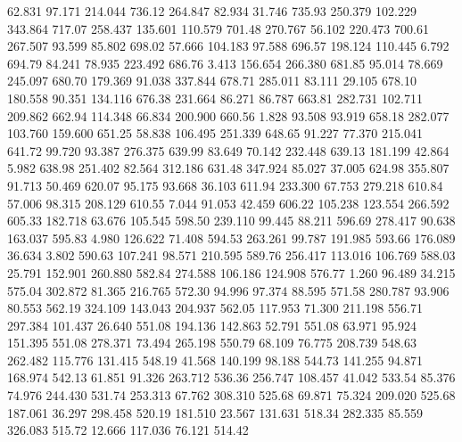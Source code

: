   62.831   97.171  214.044       736.12
 264.847   82.934   31.746       735.93
 250.379  102.229  343.864       717.07
 258.437  135.601  110.579       701.48
 270.767   56.102  220.473       700.61
 267.507   93.599   85.802       698.02
  57.666  104.183   97.588       696.57
 198.124  110.445    6.792       694.79
  84.241   78.935  223.492       686.76
   3.413  156.654  266.380       681.85
  95.014   78.669  245.097       680.70
 179.369   91.038  337.844       678.71
 285.011   83.111   29.105       678.10
 180.558   90.351  134.116       676.38
 231.664   86.271   86.787       663.81
 282.731  102.711  209.862       662.94
 114.348   66.834  200.900       660.56
   1.828   93.508   93.919       658.18
 282.077  103.760  159.600       651.25
  58.838  106.495  251.339       648.65
  91.227   77.370  215.041       641.72
  99.720   93.387  276.375       639.99
  83.649   70.142  232.448       639.13
 181.199   42.864    5.982       638.98
 251.402   82.564  312.186       631.48
 347.924   85.027   37.005       624.98
 355.807   91.713   50.469       620.07
  95.175   93.668   36.103       611.94
 233.300   67.753  279.218       610.84
  57.006   98.315  208.129       610.55
   7.044   91.053   42.459       606.22
 105.238  123.554  266.592       605.33
 182.718   63.676  105.545       598.50
 239.110   99.445   88.211       596.69
 278.417   90.638  163.037       595.83
   4.980  126.622   71.408       594.53
 263.261   99.787  191.985       593.66
 176.089   36.634    3.802       590.63
 107.241   98.571  210.595       589.76
 256.417  113.016  106.769       588.03
  25.791  152.901  260.880       582.84
 274.588  106.186  124.908       576.77
   1.260   96.489   34.215       575.04
 302.872   81.365  216.765       572.30
  94.996   97.374   88.595       571.58
 280.787   93.906   80.553       562.19
 324.109  143.043  204.937       562.05
 117.953   71.300  211.198       556.71
 297.384  101.437   26.640       551.08
 194.136  142.863   52.791       551.08
  63.971   95.924  151.395       551.08
 278.371   73.494  265.198       550.79
  68.109   76.775  208.739       548.63
 262.482  115.776  131.415       548.19
  41.568  140.199   98.188       544.73
 141.255   94.871  168.974       542.13
  61.851   91.326  263.712       536.36
 256.747  108.457   41.042       533.54
  85.376   74.976  244.430       531.74
 253.313   67.762  308.310       525.68
  69.871   75.324  209.020       525.68
 187.061   36.297  298.458       520.19
 181.510   23.567  131.631       518.34
 282.335   85.559  326.083       515.72
  12.666  117.036   76.121       514.42

